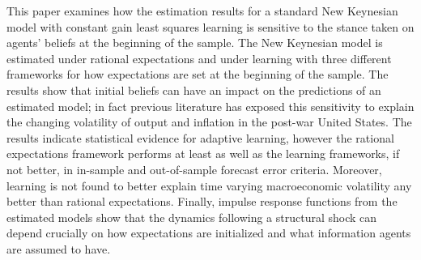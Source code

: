 This paper examines how the estimation results for a standard New Keynesian model with constant gain least squares learning is sensitive to the stance taken on agents' beliefs at the beginning of the sample.  The New Keynesian model is estimated under rational expectations and under learning with three different frameworks for how expectations are set at the beginning of the sample.  The results show that initial beliefs can have an impact on the predictions of an estimated model; in fact previous literature has exposed this sensitivity to explain the changing volatility of output and inflation in the post-war United States.  The results indicate statistical evidence for adaptive learning, however the rational expectations framework performs at least as well as the learning frameworks, if not better, in in-sample and out-of-sample forecast error criteria.  Moreover, learning is not found to better explain time varying macroeconomic volatility any better than rational expectations.  Finally, impulse response functions from the estimated models show that the dynamics following a structural shock can depend crucially on how expectations are initialized and what information agents are assumed to have.
